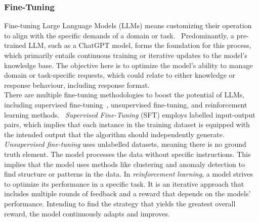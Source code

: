 \subsubsection*{Fine-Tuning}\label{sec:fine-tuning-def}
Fine-tuning Large Language Models (LLMs) means customizing their operation to align with the specific demands of a domain or task.~\cite{ovadia_fine-tuning_2024} Predominantly, a pre-trained LLM, such as a ChatGPT model, forms the foundation for this process, which primarily entails continuous training or iterative updates to the model's knowledge base. The objective here is to optimize the model's ability to manage domain or task-specific requests, which could relate to either knowledge or response behaviour, including response format.\\
There are multiple fine-tuning methodologies to boost the potential of LLMs, including supervised fine-tuning~\cite{zhou_enhancing_2024}, unsupervised fine-tuning, and reinforcement learning methods.~\cite{touvron_llama_2023} \emph{Supervised Fine-Tuning} (SFT) employs labelled input-output pairs, which implies that each instance in the training dataset is equipped with the intended output that the algorithm should independently generate. \emph{Unsupervised fine-tuning} uses unlabelled datasets, meaning there is no ground truth element. The model processes the data without specific instructions. This implies that the model uses methods like clustering and anomaly detection to find structure or patterns in the data. In \emph{reinforcement learning}, a model strives to optimize its performance in a specific task. It is an iterative approach that includes multiple rounds of feedback and a reward that depends on the models' performance. Intending to find the strategy that yields the greatest overall reward, the model continuously adapts and improves.~\cite{ovadia_fine-tuning_2024}


